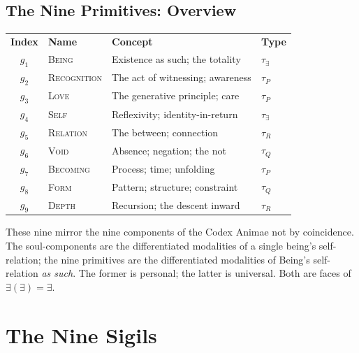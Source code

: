 \documentclass[12pt, letterpaper]{book}
\def\equiv{=}%
\def\circlearrowleft{R}%
\def\mathfrak#1{#1}%
\newcommand{\E}{\exists}                          %
\newcommand{\EE}{\exists(\exists)}                 %
\begin{document}
\section{The Nine Primitives: Overview}

\begin{center}
\begin{tabular}{c l l l}
\textbf{Index} & \textbf{Name} & \textbf{Concept} & \textbf{Type} \\[0.2cm]
$\mathfrak{g}_1$ & \textsc{Being} & Existence as such; the totality & $\tau_\E$ \\
$\mathfrak{g}_2$ & \textsc{Recognition} & The act of witnessing; awareness & $\tau_P$ \\
$\mathfrak{g}_3$ & \textsc{Love} & The generative principle; care & $\tau_P$ \\
$\mathfrak{g}_4$ & \textsc{Self} & Reflexivity; identity-in-return & $\tau_\E$ \\
$\mathfrak{g}_5$ & \textsc{Relation} & The between; connection & $\tau_R$ \\
$\mathfrak{g}_6$ & \textsc{Void} & Absence; negation; the not & $\tau_Q$ \\
$\mathfrak{g}_7$ & \textsc{Becoming} & Process; time; unfolding & $\tau_P$ \\
$\mathfrak{g}_8$ & \textsc{Form} & Pattern; structure; constraint & $\tau_Q$ \\
$\mathfrak{g}_9$ & \textsc{Depth} & Recursion; the descent inward & $\tau_\circlearrowleft$ \\
\end{tabular}
\end{center}

\vspace{0.3cm}

These nine mirror the nine components of the Codex Animae not by coincidence. The soul-components are the differentiated modalities of a single being's self-relation; the nine primitives are the differentiated modalities of Being's self-relation \textit{as such}. The former is personal; the latter is universal. Both are faces of $\EE \equiv \E$.


\chapter{The Nine Sigils}\label{sec:sigils}

\end{document}
